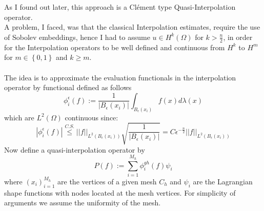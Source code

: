 \documentclass[11pt,a4paper,leqno]{report}
\numberwithin{equation}{chapter}
\begin{document}
 \\
\\
As I found out later, this approach is a Cl\'{e}ment type Quasi-Interpolation operator. \\
A problem, I faced, was that the classical Interpolation estimates, require the use of Sobolev embeddings, hence I had to assume $u\in H^k(\Omega)$ for $k>\frac{n}{2}$, in order for the Interpolation operators to be well defined and continuous from $H^k$ to $H^m$ for $m\in\left\{0,1\right\}$ and $k\geq m$.\\
\\
The idea is to approximate the evaluation functionals in the interpolation operator by functional defined as follows
\begin{equation}\phi_i^\epsilon(f):=\frac{1}{|B_\epsilon(x_i)|}\int_{B_\epsilon(x_i)}f(x)d\lambda(x)\end{equation}
which are $L^2(\Omega)$ continuous since:
\begin{equation}|\phi_i^\epsilon(f)|\overset{C.S.}{\leq} ||f||_{L^2(B_\epsilon(x_i))} \sqrt{\frac{1}{|B_\epsilon(x_i)|}}=C\epsilon^{-\frac{n}{2}}||f||_{L^2(B_\epsilon(x_i))}\end{equation}
Now define a quasi-interpolation operator by 
\begin{equation}P(f):=\sum_{i=1}^{M_h}\phi_i^{g h}(f)\psi_i\end{equation}
where $(x_i)_{i=1}^{M_h}$ are the vertices of a given mesh $C_h$ and $\psi_i$ are the Lagrangian shape functions with nodes located at the mesh vertices. For simplicity of arguments we assume the uniformity of the mesh.\\
\end{document}
